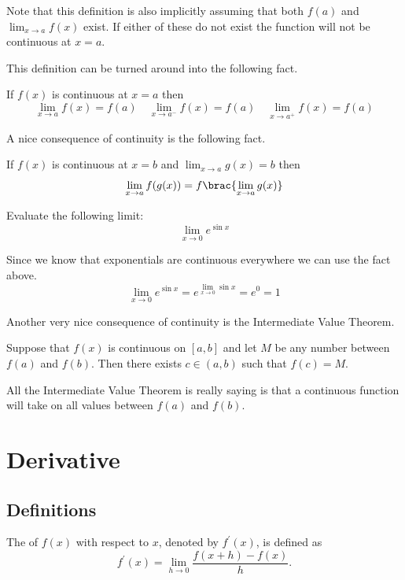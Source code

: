Note that this definition is also implicitly assuming that both $f(a)$ and $\lim_{x\to a}f(x)$ exist. If either of these do not exist the function will not be continuous at $x=a$.

This definition can be turned around into the following fact.
\begin{corollary}
If $f(x)$ is continuous at $x=a$ then
\[ \lim_{x \to a} f(x) = f(a) \quad \lim_{x \to a^-} f(x) = f(a) \quad \lim_{x \to a^+} f(x) = f(a) \]
\end{corollary}

A nice consequence of continuity is the following fact.
\begin{corollary}
If $f(x)$ is continuous at $x=b$ and $\lim_{x\to a}g(x)=b$ then
\[ \lim_{x \to a} f(g(x)) = f\brac{\lim_{x \to a} g(x)} \]
\end{corollary}

\begin{exercise}{}{}
Evaluate the following limit:
\[ \lim_{x \to 0} e^{\sin x} \]
\end{exercise}

\begin{solution}
Since we know that exponentials are continuous everywhere we can use the fact above.
\[ \lim_{x \to 0} e^{\sin x} = e^{\lim_{x \to 0} \sin x} = e^0 = \boxed{1} \]
\end{solution}

Another very nice consequence of continuity is the Intermediate Value Theorem.
\begin{theorem}
Suppose that $f(x)$ is continuous on $[a,b]$ and let $M$ be any number between $f(a)$ and $f(b)$. Then there exists $c \in (a,b)$ such that $f(c)=M$.
\end{theorem}
All the Intermediate Value Theorem is really saying is that a continuous function will take on all values between $f(a)$ and $f(b)$.
\pagebreak

\chapter{Derivative}
\section{Definitions}
\begin{definition}
The  of $f(x)$ with respect to $x$, denoted by $f^\prime(x)$, is defined as 
\begin{equation} f^\prime (x) = \lim_{h \to 0} \frac{f(x+h)-f(x)}{h}.
\end{equation}
\end{definition}

